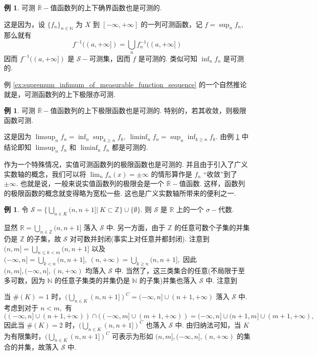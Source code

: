 \documentclass[12pt, a4paper, oneside]{book}
\numberwithin{figure}{section}
\theoremstyle{definition}
\newtheorem{example}[theorem]{例}
\begin{document}
\begin{example}\label{ex:supremum_infimum_of_measurable_function_sequence}
    可测 $\overline{\mathbb R}-$值函数列的上下确界函数也是可测的.
\end{example}
这是因为，设 $\{f_n\}_{n\in\mathbb N}$ 为 $X$ 到 $[-\infty,+\infty]$ 的一列可测函数，记 $f=\sup_n f_n,$
那么就有
\begin{equation}
    f^{-1}((a,+\infty])=\bigcup_n f_n^{-1}((a,+\infty])
\end{equation}
因而 $f^{-1}((a,+\infty])$ 是 $\mathcal S-$可测集，因而 $f$ 是可测的. 类似可知 $\inf_n f_n$ 是可测的.

例 \eqref{ex:supremum_infimum_of_measurable_function_sequence} 的一个自然推论就是，可测函数列的上下极限亦可测.
\begin{example}
    可测 $\overline{\mathbb R}-$值函数列的上下极限函数也是可测的. 特别的，若其收敛，则极限函数可测.
\end{example}
这是因为 $\limsup_n f_n=\inf_n \sup_{k\geq n} f_k,\ \liminf_n f_n=\sup_n \inf_{k\geq n} f_k.$ 由例 \ref{ex:supremum_infimum_of_measurable_function_sequence} 中结论即知 $\limsup_n f_n$ 和 $\liminf_n f_n$ 都是可测的. 

作为一个特殊情况，实值可测函数列的极限函数也是可测的. 并且由于引入了广义实数轴的概念，我们可以将 $\lim_n f_n(x)=\pm\infty$ 的情形算作是 $f_n$ ``收敛''到了 $\pm\infty.$ 也就是说，一般来说实值函数列的极限会是一个 $\overline{\mathbb R}-$值函数. 
这样，函数列的极限函数的概念就变得略为宽松一些. 这也是广义实数轴所带来的便利之一.

\begin{example}\label{ex:sigma_algebra_partition}
    令 $\mathcal S=\{\bigcup_{n\in K}(n,n+1]|\ K\subset\mathbb Z\}\cup\{\emptyset\}.$ 则 $\mathcal S$ 是 $\mathbb R$ 上的一个 $\sigma-$代数.
\end{example}
显然 $\mathbb R=\bigcup_{n\in\mathbb Z}(n,n+1]$ 落入 $\mathcal S$ 中. 另一方面，由于 $\mathbb Z$ 的任意可数个子集的并集仍是 $\mathbb Z$ 的子集，故 
$\mathcal S$ 对可数并封闭(事实上对任意并都封闭).
注意到 
$(n,m]=\bigcup_{n\leq k<m}(n,n+1]$ 以及 $(-\infty,n]=\bigcup_{k<n}(n,n+1],\ (n,+\infty)=\bigcup_{k\geq n}(n,n+1],$ 因此 $(n,m],(-\infty,n],(n,+\infty)$ 均落入 $\mathcal S$ 中.
当然了，这三类集合的任意(不局限于至多可数，因为 $\mathbb N$ 的任意子集类的并集仍是 $\mathbb N$ 的子集)并集也落入 $\mathcal S$ 中. 注意到

当 $\#(K)=1$ 时，$(\bigcup_{n\in K}(n,n+1])^C=(-\infty,n]\cup (n+1,+\infty)$ 落入 $\mathcal S$ 中. 
考虑到对于 $n<m,$ 有 $((-\infty,n]\cup (n+1,+\infty))\cap ((-\infty,m]\cup (m+1,+\infty))=(-\infty,n]\cup (n+1,m]\cup (m+1,+\infty),$ 因此当 $\#(K)=2$ 时，$(\bigcup_{n\in K}(n,n+1])^C$ 也落入 $\mathcal S$ 中. 
由归纳法可知，当 $K$ 为有限集时，$(\bigcup_{n\in K}(n,n+1])^C$ 可表示为形如 $(n,m],(-\infty,n],(n,+\infty)$ 的集合的并集，故落入 $\mathcal S$ 中.
\end{document}
